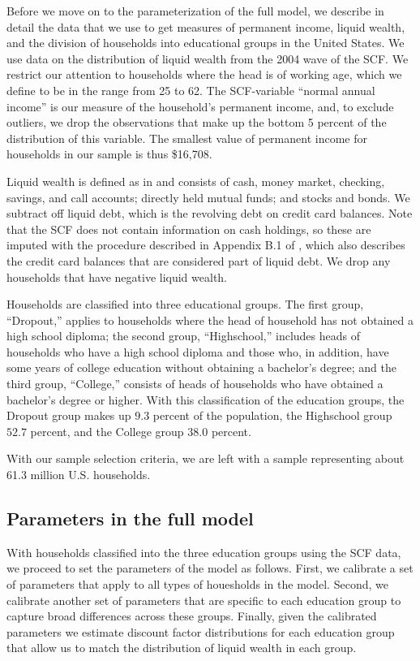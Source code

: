 \documentclass[\econtexRoot/HAFiscal]{subfiles}
\begin{document}
Before we move on to the parameterization of the full model, we describe in detail the data that we use to get measures of permanent income, liquid wealth, and the division of households into educational groups in the United States.
We use data on the distribution of liquid wealth from the 2004 wave of the SCF.
We restrict our attention to households where the head is of working age, which we define to be in the range from 25 to 62.
The SCF-variable ``normal annual income'' is our measure of the household's permanent income, and, to exclude outliers, we drop the observations that make up the bottom 5 percent of the distribution of this variable.
The smallest value of permanent income for households in our sample is thus \$16,708.


Liquid wealth is defined as in \cite{kaplan2014model} and consists of cash, money market, checking, savings, and call accounts; directly held mutual funds; and stocks and bonds.
We subtract off liquid debt, which is the revolving debt on credit card balances.
Note that the SCF does not contain information on cash holdings, so these are imputed with the procedure described in Appendix B.1 of \cite{kaplan2014model}, which also describes the credit card balances that are considered part of liquid debt.
We drop any households that have negative liquid wealth.


Households are classified into three educational groups.
The first group, ``Dropout,'' applies to households where the head of household has not obtained a high school diploma; the second group, ``Highschool,'' includes heads of households who have a high school diploma and those who, in addition, have some years of college education without obtaining a bachelor's degree; and the third group, ``College,'' consists of heads of households who have obtained a bachelor's degree or higher.
With this classification of the education groups, the Dropout group makes up $9.3$ percent of the population, the Highschool group $52.7$ percent, and the College group $38.0$ percent.


With our sample selection criteria, we are left with a sample representing about 61.3 million U.S.
households.

\subsection{Parameters in the full model}
\notinsubfile{\label{sec:paramsFull}}

With households classified into the three education groups using the SCF data, we proceed to set the parameters of the model as follows.
First, we calibrate a set of parameters that apply to all types of houesholds in the model.
Second, we calibrate another set of parameters that are specific to each education group to capture broad differences across these groups.
Finally, given the calibrated parameters we estimate discount factor distributions for each education group that allow us to match the distribution of liquid wealth in each group.
\end{document}
